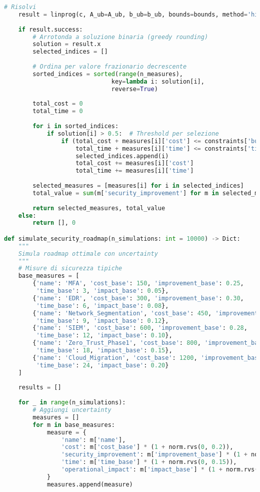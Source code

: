 \begin{lstlisting}[language=Python, caption=Framework Prioritizzazione Investimenti Sicurezza]
    # Risolvi
    result = linprog(c, A_ub=A_ub, b_ub=b_ub, bounds=bounds, method='highs')
    
    if result.success:
        # Arrotonda a soluzione binaria (greedy rounding)
        solution = result.x
        selected_indices = []
        
        # Ordina per valore frazionario decrescente
        sorted_indices = sorted(range(n_measures), 
                              key=lambda i: solution[i], 
                              reverse=True)
        
        total_cost = 0
        total_time = 0
        
        for i in sorted_indices:
            if solution[i] > 0.5:  # Threshold per selezione
                if (total_cost + measures[i]['cost'] <= constraints['budget'] and
                    total_time + measures[i]['time'] <= constraints['timeline']):
                    selected_indices.append(i)
                    total_cost += measures[i]['cost']
                    total_time += measures[i]['time']
        
        selected_measures = [measures[i] for i in selected_indices]
        total_value = sum(m['security_improvement'] for m in selected_measures)
        
        return selected_measures, total_value
    else:
        return [], 0

def simulate_security_roadmap(n_simulations: int = 10000) -> Dict:
    """
    Simula roadmap ottimale con uncertainty
    """
    # Misure di sicurezza tipiche
    base_measures = [
        {'name': 'MFA', 'cost_base': 150, 'improvement_base': 0.25, 
         'time_base': 3, 'impact_base': 0.05},
        {'name': 'EDR', 'cost_base': 300, 'improvement_base': 0.30, 
         'time_base': 6, 'impact_base': 0.08},
        {'name': 'Network_Segmentation', 'cost_base': 450, 'improvement_base': 0.35, 
         'time_base': 9, 'impact_base': 0.12},
        {'name': 'SIEM', 'cost_base': 600, 'improvement_base': 0.28, 
         'time_base': 12, 'impact_base': 0.10},
        {'name': 'Zero_Trust_Phase1', 'cost_base': 800, 'improvement_base': 0.42, 
         'time_base': 18, 'impact_base': 0.15},
        {'name': 'Cloud_Migration', 'cost_base': 1200, 'improvement_base': 0.38, 
         'time_base': 24, 'impact_base': 0.20}
    ]
    
    results = []
    
    for _ in range(n_simulations):
        # Aggiungi uncertainty
        measures = []
        for m in base_measures:
            measure = {
                'name': m['name'],
                'cost': m['cost_base'] * (1 + norm.rvs(0, 0.2)),
                'security_improvement': m['improvement_base'] * (1 + norm.rvs(0, 0.1)),
                'time': m['time_base'] * (1 + norm.rvs(0, 0.15)),
                'operational_impact': m['impact_base'] * (1 + norm.rvs(0, 0.1))
            }
            measures.append(measure)
        

\end{lstlisting}
